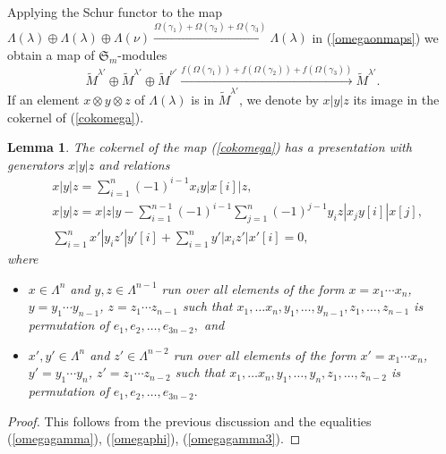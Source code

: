 \documentclass[11pt]{amsart}
\newtheorem{lem}[thm]{Lemma}
\theoremstyle{definition}
\numberwithin{equation}{section}
\begin{document}
Applying the Schur functor to the map $\Lambda(\lambda) \oplus \Lambda(\lambda) \oplus  \Lambda(\nu) \xrightarrow{\Omega(\gamma_1) + \Omega(\gamma_2)+ \Omega(\gamma_3)} \Lambda(\lambda)$ in (\ref{omegaonmaps}) we obtain a map of $\mathfrak{S}_m$-modules \begin{equation}\label{cokomega} \tilde{M}^{\lambda'} \oplus \tilde{M}^{\lambda'}  \oplus  \tilde{M}^{\nu'}\xrightarrow{f(\Omega(\gamma_1)) + f(\Omega(\gamma_2)) + f(\Omega(\gamma_3))} \tilde{M}^{\lambda'}.\end{equation} If an element $x\otimes y \otimes z$ of $\Lambda(\lambda)$ is in $\tilde{M}^{\lambda'}$, we denote by $x|y|z$ its image in the cokernel of (\ref{cokomega}).
\begin{lem}\label{pres1} The cokernel of the map (\ref{cokomega}) has a presentation with generators $x|y|z$ and relations 
	\begin{align}\label{45}&x|y|z=\sum_{i=1}^n(-1)^{i-1}x_iy | x[i] | z,\\\label{46}
		&x|y|z=x | z | y-\sum_{i=1}^{n-1}(-1)^{i-1}\sum_{j=1}^n(-1)^{j-1}y_iz | x_jy[i] | x[j],\\\label{47}&\sum_{i=1}^{n} x' | y_i z' | y'[i] + \sum_{i=1}^{n} y' | x_i z' | x'[i] =0,\end{align}
	where \begin{itemize} \item $x \in \Lambda^n$ and $y,z \in \Lambda^{n-1}$ run over all elements of the form $x=x_{1} \cdots x_{n}$, $y=y_{1} \cdots y_{{n-1}}$, $z=z_{1} \cdots z_{n-1}$ such that $x_1, \dots x_{n}, y_1, \dots, y_{n-1}, z_1, \dots, z_{n-1}$ is permutation of $e_1,e_2, \dots, e_{3n-2},$ and
		\item $x', y' \in \Lambda^n$ and $z' \in \Lambda^{n-2}$ run over all elements of the form $x'=x_{1} \cdots x_{n}$, $y'=y_{1} \cdots y_{{n}}$, $z'=z_{1} \cdots z_{n-2}$ such that $x_1, \dots x_{n}, y_1, \dots, y_{n}, z_1, \dots, z_{n-2}$ is permutation of $e_1,e_2, \dots, e_{3n-2}.$
		\end{itemize}
\end{lem}
\begin{proof}
	This follows from the previous discussion and the equalities (\ref{omegagamma}), (\ref{omegaphi}), (\ref{omegagamma3}).
\end{proof}
\end{document}
